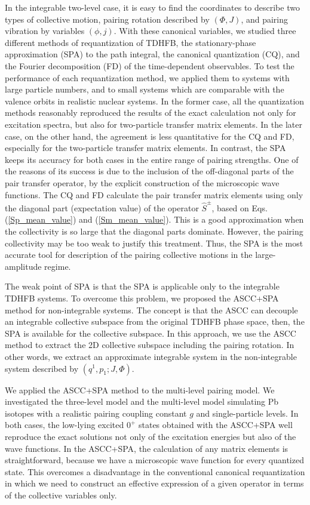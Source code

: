 \documentclass[11pt]{book} %
\begin{document}
In the integrable two-level case, it is easy to find the coordinates to describe two types of collective motion, pairing rotation described by $(\Phi, J)$, and pairing vibration by variables $(\phi, j)$. With these canonical variables, we studied three different methods of requantization of TDHFB, the stationary-phase approximation (SPA) to the path integral, the canonical quantization (CQ), and the Fourier decomposition (FD) of the time-dependent observables. 
To test the performance of each requantization method, we applied them to systems with large particle numbers, and to small systems which are comparable with the valence orbits in realistic nuclear systems. 
In the former case, all the quantization methods reasonably reproduced the results of the
exact calculation not only for excitation spectra, but also for two-particle transfer matrix elements.
In the later case, on the other hand, the agreement is
less quantitative for the CQ and FD, especially for the two-particle
transfer matrix elements.
In contrast, the SPA keeps its accuracy for both cases in the entire range of
pairing strengths.
One of the reasons of its success is due to the inclusion of the off-diagonal 
parts of the pair transfer operator,
by the explicit construction of the microscopic wave functions.
The CQ and FD calculate the pair transfer matrix elements using only
the diagonal part (expectation value) of the operator $\hat{S}^\pm$,
based on Eqs. (\ref{Sp_mean_value}) and (\ref{Sm_mean_value}).
This is a good approximation when the collectivity is so large that the
diagonal parts dominate.
However, the pairing collectivity may be too weak to justify this
treatment.
Thus, the SPA is the most accurate tool for description of the pairing collective motions in the large-amplitude regime.

The weak point of SPA is that the SPA is applicable only to the
integrable TDHFB systems. To overcome this problem, we proposed the ASCC+SPA method for non-integrable systems. The concept is that the ASCC can decouple an integrable collective subspace from the original TDHFB phase space, then, the SPA is available for the collective subspace.
In this approach, we use the ASCC method to extract the 2D
collective subspace including the pairing rotation.
In other words, we extract an approximate integrable system 
in the non-integrable system described by $(q^1,p_1;J,\Phi)$.

We applied the ASCC+SPA method to the multi-level pairing model.
We investigated the three-level model and 
the multi-level model simulating Pb isotopes
with a realistic pairing coupling constant $g$ and single-particle levels.
In both cases, the low-lying excited $0^+$ states obtained with
the ASCC+SPA well reproduce the exact solutions
not only of the excitation energies but also of the wave functions.
In the ASCC+SPA, the calculation of any matrix elements is straightforward,
because we have a microscopic wave function for every quantized state.
This overcomes a disadvantage in the conventional canonical requantization
in which we need to construct an effective expression of a given operator
in terms of the collective variables only.
\end{document}
